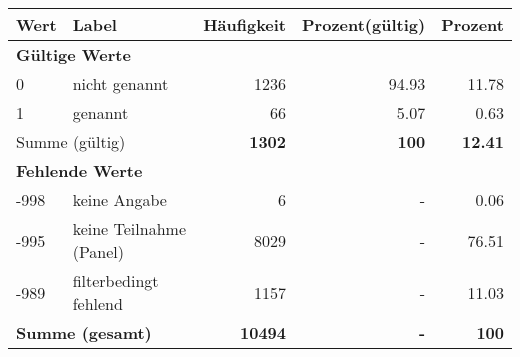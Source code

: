      \begin{longtable}{lXrrr}
     \toprule
     \textbf{Wert} & \textbf{Label} & \textbf{Häufigkeit} & \textbf{Prozent(gültig)} & \textbf{Prozent} \\
     \endhead
     \midrule
     \multicolumn{5}{l}{\textbf{Gültige Werte}}\\

     0 &
     \multicolumn{1}{X}{ nicht genannt   } &


       \num{1236} &
       \num[round-mode=places,round-precision=2]{94,93} &
         \num[round-mode=places,round-precision=2]{11,78} \\

     1 &
     \multicolumn{1}{X}{ genannt   } &


       \num{66} &
       \num[round-mode=places,round-precision=2]{5,07} &
         \num[round-mode=places,round-precision=2]{0,63} \\
     \midrule
     \multicolumn{2}{l}{Summe (gültig)} &
       \textbf{\num{1302}} &
     \textbf{100} &
       \textbf{\num[round-mode=places,round-precision=2]{12,41}} \\
     \multicolumn{5}{l}{\textbf{Fehlende Werte}}\\
       -998 &
       keine Angabe &
         \num{6} &
        - &
         \num[round-mode=places,round-precision=2]{0,06} \\
       -995 &
       keine Teilnahme (Panel) &
         \num{8029} &
        - &
         \num[round-mode=places,round-precision=2]{76,51} \\
       -989 &
       filterbedingt fehlend &
         \num{1157} &
        - &
         \num[round-mode=places,round-precision=2]{11,03} \\
     \midrule
     \multicolumn{2}{l}{\textbf{Summe (gesamt)}} &
          \textbf{\num{10494}} &
        \textbf{-} &
        \textbf{100} \\
     \bottomrule
     \end{longtable}
     
